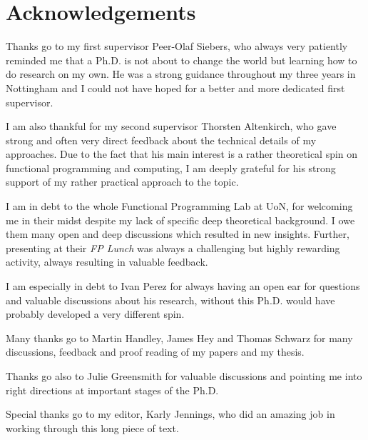 \chapter*{Acknowledgements}
Thanks go to my first supervisor Peer-Olaf Siebers, who always very patiently reminded me that a Ph.D. is not about to change the world but learning how to do research on my own. He was a strong guidance throughout my three years in Nottingham and I could not have hoped for a better and more dedicated first supervisor.

I am also thankful for my second supervisor Thorsten Altenkirch, who gave strong and often very direct feedback about the technical details of my approaches. Due to the fact that his main interest is a rather theoretical spin on functional programming and computing, I am deeply grateful for his strong support of my rather practical approach to the topic.

I am in debt to the whole Functional Programming Lab at UoN, for welcoming me in their midst despite my lack of specific deep theoretical background. I owe them many open and deep discussions which resulted in new insights. Further, presenting at their \textit{FP Lunch} was always a challenging but highly rewarding activity, always resulting in valuable feedback.

I am especially in debt to Ivan Perez for always having an open ear for questions and valuable discussions about his research, without this Ph.D. would have probably developed a very different spin.

Many thanks go to Martin Handley, James Hey and Thomas Schwarz for many discussions, feedback and proof reading of my papers and my thesis.

Thanks go also to Julie Greensmith for valuable discussions and pointing me into right directions at important stages of the Ph.D.

Special thanks go to my editor, Karly Jennings, who did an amazing job in working through this long piece of text.